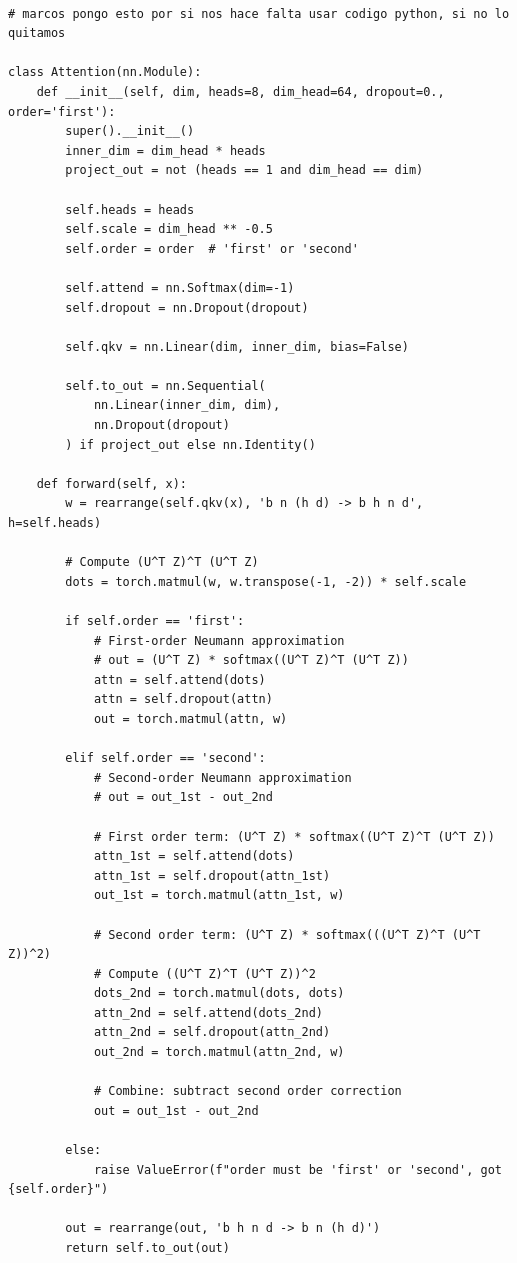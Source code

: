 \documentclass{article}
\begin{document}
\begin{lstlisting}[caption=la atencion, que es lo unico que cambia]

# marcos pongo esto por si nos hace falta usar codigo python, si no lo quitamos

class Attention(nn.Module):
    def __init__(self, dim, heads=8, dim_head=64, dropout=0., order='first'):
        super().__init__()
        inner_dim = dim_head * heads
        project_out = not (heads == 1 and dim_head == dim)

        self.heads = heads
        self.scale = dim_head ** -0.5
        self.order = order  # 'first' or 'second'

        self.attend = nn.Softmax(dim=-1)
        self.dropout = nn.Dropout(dropout)

        self.qkv = nn.Linear(dim, inner_dim, bias=False)

        self.to_out = nn.Sequential(
            nn.Linear(inner_dim, dim),
            nn.Dropout(dropout)
        ) if project_out else nn.Identity()

    def forward(self, x):
        w = rearrange(self.qkv(x), 'b n (h d) -> b h n d', h=self.heads)

        # Compute (U^T Z)^T (U^T Z)
        dots = torch.matmul(w, w.transpose(-1, -2)) * self.scale

        if self.order == 'first':
            # First-order Neumann approximation
            # out = (U^T Z) * softmax((U^T Z)^T (U^T Z))
            attn = self.attend(dots)
            attn = self.dropout(attn)
            out = torch.matmul(attn, w)

        elif self.order == 'second':
            # Second-order Neumann approximation
            # out = out_1st - out_2nd

            # First order term: (U^T Z) * softmax((U^T Z)^T (U^T Z))
            attn_1st = self.attend(dots)
            attn_1st = self.dropout(attn_1st)
            out_1st = torch.matmul(attn_1st, w)

            # Second order term: (U^T Z) * softmax(((U^T Z)^T (U^T Z))^2)
            # Compute ((U^T Z)^T (U^T Z))^2
            dots_2nd = torch.matmul(dots, dots)
            attn_2nd = self.attend(dots_2nd)
            attn_2nd = self.dropout(attn_2nd)
            out_2nd = torch.matmul(attn_2nd, w)

            # Combine: subtract second order correction
            out = out_1st - out_2nd

        else:
            raise ValueError(f"order must be 'first' or 'second', got {self.order}")

        out = rearrange(out, 'b h n d -> b n (h d)')
        return self.to_out(out)

\end{lstlisting}
\end{document}
